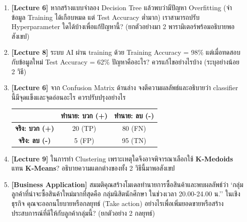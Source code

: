 \documentclass[a4paper,12pt]{article}
\begin{document}
\begin{enumerate}[label=\textbf{\arabic*.}]

\item \textbf{[Lecture 6]} หากสร้างแบบจำลอง Decision Tree แล้วพบว่ามีปัญหา Overfitting (จำข้อมูล Training ได้เกือบหมด แต่ Test Accuracy ต่ำมาก) เราสามารถปรับ Hyperparameter ใดได้บ้างเพื่อแก้ปัญหานี้? (ยกตัวอย่างมา 2 พารามิเตอร์พร้อมอธิบายพอสังเขป)
\vspace{3.5cm}

\item \textbf{[Lecture 8]} ระบบ AI ผ่าน training ด้วย Training Accuracy = 98\% แต่เมื่อทดสอบกับข้อมูลใหม่ Test Accuracy = 62\% ปัญหาคืออะไร? ควรแก้ไขอย่างไรบ้าง (ระบุอย่างน้อย 2 วิธี)
\vspace{3.5cm}

\item \textbf{[Lecture 6]} จาก Confusion Matrix ด้านล่าง จงตีความผลลัพธ์และอธิบายว่า classifier นี้มีจุดแข็งและจุดอ่อนอะไร ควรปรับปรุงอย่างไร

\begin{center}
\renewcommand{\arraystretch}{1.3}
\begin{tabular}{c|cc}
    \hline
    \rowcolor{cyan!15}
    & \textbf{ทำนาย: บวก (+)} & \textbf{ทำนาย: ลบ (-)} \\
    \hline
    \textbf{จริง: บวก (+)} & 20 (TP) & 80 (FN) \\
    \textbf{จริง: ลบ (-)} & 5 (FP) & 95 (TN) \\
    \hline
\end{tabular}
\end{center}
\vspace{3.5cm}

\item \textbf{[Lecture 9]} ในการทำ Clustering เพราะเหตุใดจึงอาจพิจารณาเลือกใช้ \textbf{K-Medoids} แทน \textbf{K-Means}? อธิบายความแตกต่างของทั้ง 2 วิธีนี้มาพอสังเขป
\vspace{3.5cm}

\item \textbf{[Business Application]} สมมติคุณสร้างโมเดลทำนายการซื้อสินค้าและพบผลลัพธ์ว่า `กลุ่มลูกค้าที่น่าจะซื้อสินค้าใหม่มากที่สุดคือ กลุ่มนิสิตนักศึกษา ในช่วงเวลา 20.00-24.00 น.'' ในเชิงธุรกิจ คุณจะออกนโยบายหรือกลยุทธ์ (Take action) อย่างไรเพื่อเพิ่มยอดขายหรือสร้างประสบการณ์ที่ดีให้กับลูกค้ากลุ่มนี้? (ยกตัวอย่าง 2 กลยุทธ์)
\vspace{3.5cm}

\end{enumerate}
\end{document}
